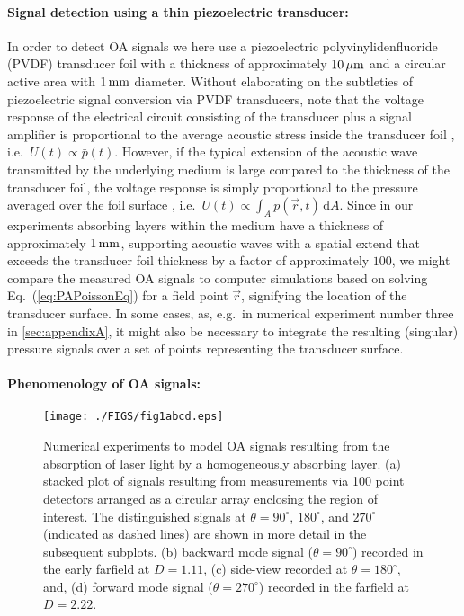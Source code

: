 \documentclass[12pt]{iopart}
\begin{document}
\paragraph{Signal detection using a thin piezoelectric transducer:}
In order to detect OA signals we here use a piezoelectric polyvinylidenfluoride
(PVDF) transducer foil with a thickness of approximately $10\,{\rm{\mu m}}$ 
and a circular active area with $1\,{\rm mm}$ diameter.
Without elaborating on the subtleties of piezoelectric signal conversion via
PVDF transducers, note that the voltage response of the electrical circuit
consisting of the transducer plus a signal amplifier is proportional to the
average acoustic stress inside the transducer foil
\cite{Schoeffmann:1988,Paltauf:1997}, i.e.\ $U(t)\propto \bar{p}(t)$. However,
if the typical extension of the acoustic wave transmitted by the underlying
medium is large compared to the thickness of the transducer foil, the voltage
response is simply proportional to the pressure averaged over the foil surface
\cite{Sigrist:1978,Jaeger:2005}, i.e.\ $U(t)\propto \int_A p(\vec{r},t)\,\mathrm{d}A$. Since
in our experiments absorbing layers within the medium have a thickness of
approximately $1\,{\rm mm}$, supporting acoustic waves with a spatial extend
that exceeds the transducer foil thickness by a factor of approximately $100$,
we might compare the measured OA signals to computer simulations based on
solving Eq.\ (\ref{eq:PAPoissonEq}) for a field point $\vec{r}$, signifying the
location of the transducer surface. In some cases, as, e.g.\ in numerical
experiment number three in \ref{sec:appendixA}, it might also be necessary to
integrate the resulting (singular) pressure signals over a set of points
representing the transducer surface.

\paragraph{Phenomenology of OA signals:}

\begin{figure}[t!]
\centerline{\texttt{[image: ./FIGS/fig1abcd.eps]}} 
\caption{Numerical experiments to model OA signals resulting from the
absorption of laser light by a homogeneously absorbing layer.
(a) stacked plot of signals resulting from measurements via 100 point detectors 
arranged as a circular array enclosing the region of interest. The distinguished
signals at $\theta=90^{\circ}$, $180^{\circ}$, and $270^{\circ}$ (indicated as dashed lines) are 
shown in more detail in the subsequent subplots.
(b) backward mode signal ($\theta=90^{\circ}$) recorded in the early farfield at $D=1.11$,
(c) side-view recorded at $\theta=180^{\circ}$, and,
(d) forward mode signal ($\theta=270^{\circ}$) recorded in the farfield at $D=2.22$.}
\label{fig:theory}
\end{figure}
\end{document}
